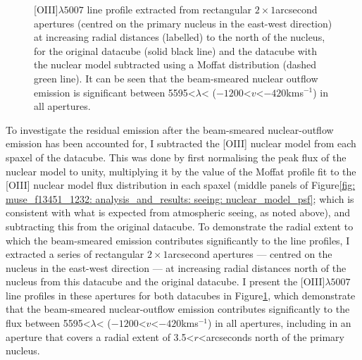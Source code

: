 \begin{figure}[!t]
\begin{subfigure}[]{0.48\linewidth}
    \end{subfigure}
    \caption[{[}OIII{]}$\lambda$5007 line profiles extracted from apertures at increasing radial distances north of the primary nucleus of F13451+1232, for cases in which beam smearing of nuclear emission is and is-not accounted for.]{[OIII]$\lambda5007$ line profile extracted from rectangular $2\times1$\;arcsecond apertures (centred on the primary nucleus in the east-west direction) at increasing radial distances (labelled) to the north of the nucleus, for the original datacube (solid black line) and the datacube with the nuclear model subtracted using a Moffat distribution (dashed green line). It can be seen that the beam-smeared nuclear outflow emission is significant between 5595\;\textless\;$\lambda$\;\textless{}\;{\AA} ($-1200$\;\textless\;$v$\;\textless\;$-420$\;km\;s$^{-1}$) in all apertures.}
    \label{fig: muse_f13451_1232: analysis_and_results: seeing: broadsub_line_profile_comparison}
\end{figure}

To investigate the residual emission after the beam-smeared nuclear-outflow emission has been accounted for, I subtracted the [OIII] nuclear model from each spaxel of the datacube. This was done by first normalising the peak flux of the nuclear model to unity, multiplying it by the value of the Moffat profile fit to the [OIII] nuclear model flux distribution in each spaxel (middle panels of Figure\;\ref{fig: muse_f13451_1232: analysis_and_results: seeing: nuclear_model_psf}; which is consistent with what is expected from atmospheric seeing, as noted above), and subtracting this from the original datacube. To demonstrate the radial extent to which the beam-smeared emission contributes significantly to the line profiles, I extracted a series of rectangular $2\times1$\;arcsecond apertures --- centred on the nucleus in the east-west direction --- at increasing radial distances north of the nucleus from this datacube and the original datacube. I present the [OIII]$\lambda5007$ line profiles in these apertures for both datacubes in Figure\;\ref{fig: muse_f13451_1232: analysis_and_results: seeing: broadsub_line_profile_comparison}, which demonstrate that the beam-smeared nuclear-outflow emission contributes significantly to the flux between 5595\;\textless\;$\lambda$\;\textless{}\;{\AA} ($-1200$\;\textless\;$v$\;\textless\;$-420$\;km\;s$^{-1}$) in all apertures, including in an aperture that covers a radial extent of 3.5\;\textless\;$r$\;\textless{}\;arcseconds north of the primary nucleus.

